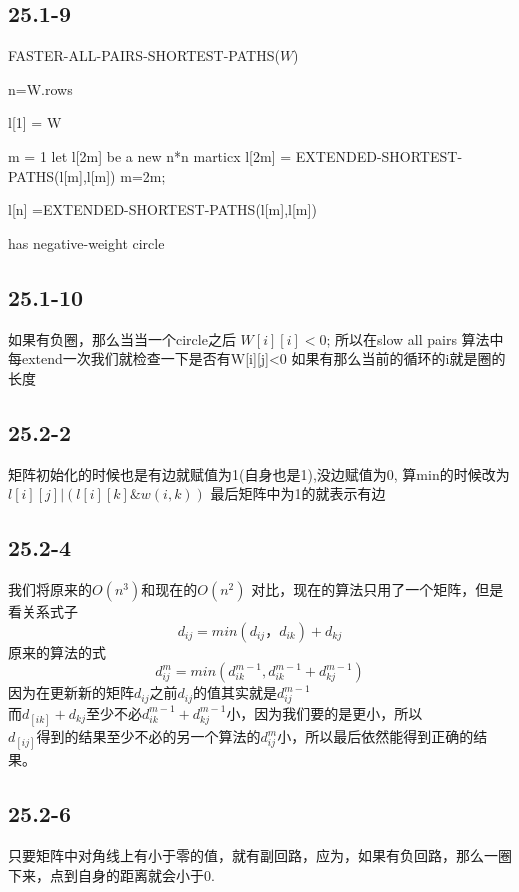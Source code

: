 \documentclass[a4paper,UTF8]{article}
\theoremstyle{definition}
\begin{document}
\subsection*{25.1-9}
\begin{algorithm}[h]
  \caption{FASTER-ALL-PAIRS-SHORTEST-PATHS($W$)}
  \begin{algorithmic}[1]
   \item n=W.rows
   \item l[1] = W
   \item m = 1
    \State let l[2m] be a new n*n marticx
    \State l[2m] = EXTENDED-SHORTEST-PATHS(l[m],l[m])
    \State m=2m;
  \EndWhile

  \item l[n] =EXTENDED-SHORTEST-PATHS(l[m],l[m])

        \State has negative-weight circle
  \EndIf
  \end{algorithmic}
\end{algorithm}

\subsection*{25.1-10}
如果有负圈，那么当当一个circle之后 $W[i][i]<0$;
所以在slow all pairs 算法中每extend一次我们就检查一下是否有W[i][j]<0
如果有那么当前的循环的i就是圈的长度
\subsection*{25.2-2}
矩阵初始化的时候也是有边就赋值为1(自身也是1),没边赋值为0,
算min的时候改为$l[i][j]|(l[i][k]\&w(i,k))$
最后矩阵中为1的就表示有边


\subsection*{25.2-4}

我们将原来的$O(n^3)$和现在的$O(n^2)$
对比，现在的算法只用了一个矩阵，但是看关系式子
$$d_{ij}=min(d_{ij}，d_{ik})+d_{kj}$$
原来的算法的式
$$d_{ij}^m=min(d_{ik}^{m-1},d_{ik}^{m-1}+d_{kj}^{m-1})$$
因为在更新新的矩阵$d_{ij}$之前$d_{ij}$的值其实就是$d_{ij}^{m-1}$\\
而$d_[ik]+d_{kj}$至少不必$d_{ik}^{m-1}+d_{kj}^{m-1}$小，因为我们要的是更小，所以\\
$d_[ij]$得到的结果至少不必的另一个算法的$d_{ij}^m$小，所以最后依然能得到正确的结果。\\

\subsection*{25.2-6}
只要矩阵中对角线上有小于零的值，就有副回路，应为，如果有负回路，那么一圈下来，点到自身的距离就会小于0.
\end{document}
